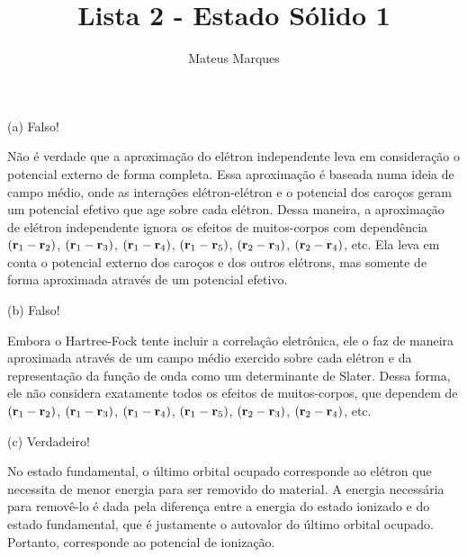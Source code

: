 \documentclass[a4paper,10pt]{article}
\title{\Huge{\textbf{Lista 2 - Estado Sólido 1}}}
\author{Mateus Marques}
\begin{document}
\maketitle

\section{}

(a) Falso!

\n

Não é verdade que a aproximação do elétron independente leva em consideração o potencial externo de forma completa. Essa aproximação é baseada numa ideia de campo médio, onde as interações elétron-elétron e o potencial dos caroços geram um potencial efetivo que age sobre cada elétron. Dessa maneira, a aproximação de elétron independente ignora os efeitos de muitos-corpos com dependência $({\vb{r}}_1 - {\vb{r}}_2)$, $({\vb{r}}_1 - {\vb{r}}_3)$, $({\vb{r}}_1 - {\vb{r}}_4)$,  $({\vb{r}}_1 - {\vb{r}}_5)$, $({\vb{r}}_2 - {\vb{r}}_3)$, $({\vb{r}}_2 - {\vb{r}}_4)$, etc. Ela leva em conta o potencial externo dos caroços e dos outros elétrons, mas somente de forma aproximada através de um potencial efetivo.

\n\n

(b) Falso!

\n

Embora o Hartree-Fock tente incluir a correlação eletrônica, ele o faz de maneira aproximada através de um campo médio exercido sobre cada elétron e da representação da função de onda como um determinante de Slater. Dessa forma, ele não considera exatamente todos os efeitos de muitos-corpos, que dependem de $({\vb{r}}_1 - {\vb{r}}_2)$, $({\vb{r}}_1 - {\vb{r}}_3)$, $({\vb{r}}_1 - {\vb{r}}_4)$,  $({\vb{r}}_1 - {\vb{r}}_5)$, $({\vb{r}}_2 - {\vb{r}}_3)$, $({\vb{r}}_2 - {\vb{r}}_4)$, etc.

\n\n

(c) Verdadeiro!

\n

No estado fundamental, o último orbital ocupado corresponde ao elétron que necessita de menor energia para ser removido do material. A energia necessária para removê-lo é dada pela diferença entre a energia do estado ionizado e do estado fundamental, que é justamente o autovalor do último orbital ocupado. Portanto, corresponde ao potencial de ionização.

\pagebreak

\section{}
\end{document}
